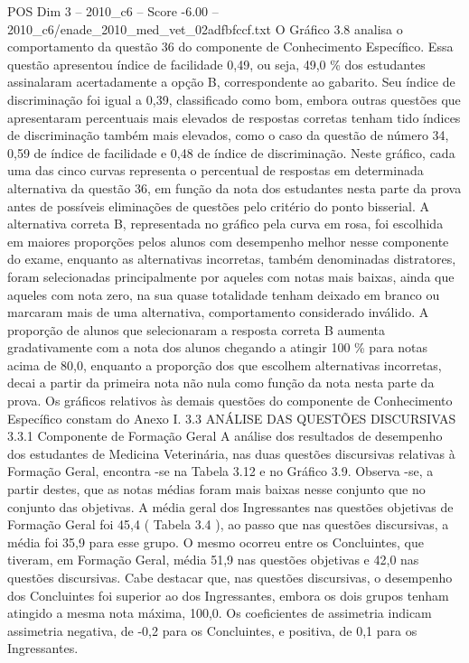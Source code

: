 \begin{textsample}{POS Dim 3 – 2010\_c6 – Score -6.00 – 2010\_c6/enade\_2010\_med\_vet\_02adfbfccf.txt}
O Gráfico 3.8 analisa o comportamento da questão 36 do componente de Conhecimento Específico.
Essa questão apresentou índice de facilidade 0,49, ou seja, 49,0 \% dos estudantes assinalaram acertadamente a opção B, correspondente ao gabarito.
Seu índice de discriminação foi igual a 0,39, classificado como bom, embora outras questões que apresentaram percentuais mais elevados de respostas corretas tenham tido índices de discriminação também mais elevados, como o caso da questão de número 34, 0,59 de índice de facilidade e 0,48 de índice de discriminação.
Neste gráfico, cada uma das cinco curvas representa o percentual de respostas em determinada alternativa da questão 36, em função da nota dos estudantes nesta parte da prova antes de possíveis eliminações de questões pelo critério do ponto bisserial.
A alternativa correta B, representada no gráfico pela curva em rosa, foi escolhida em maiores proporções pelos alunos com desempenho melhor nesse componente do exame, enquanto as alternativas incorretas, também denominadas distratores, foram selecionadas principalmente por aqueles com notas mais baixas, ainda que aqueles com nota zero, na sua quase totalidade tenham deixado em branco ou marcaram mais de uma alternativa, comportamento considerado inválido.
A proporção de alunos que selecionaram a resposta correta B aumenta gradativamente com a nota dos alunos chegando a atingir 100 \% para notas acima de 80,0, enquanto a proporção dos que escolhem alternativas incorretas, decai a partir da primeira nota não nula como função da nota nesta parte da prova.
Os gráficos relativos às demais questões do componente de Conhecimento Específico constam do Anexo I. 3.3 ANÁLISE DAS QUESTÕES DISCURSIVAS 3.3.1 Componente de Formação Geral A análise dos resultados de desempenho dos estudantes de Medicina Veterinária, nas duas questões discursivas relativas à Formação Geral, encontra -se na Tabela 3.12 e no Gráfico 3.9.
Observa -se, a partir destes, que as notas médias foram mais baixas nesse conjunto que no conjunto das objetivas.
A média geral dos Ingressantes nas questões objetivas de Formação Geral foi 45,4 ( Tabela 3.4 ), ao passo que nas questões discursivas, a média foi 35,9 para esse grupo.
O mesmo ocorreu entre os Concluintes, que tiveram, em Formação Geral, média 51,9 nas questões objetivas e 42,0 nas questões discursivas.
Cabe destacar que, nas questões discursivas, o desempenho dos Concluintes foi superior ao dos Ingressantes, embora os dois grupos tenham atingido a mesma nota máxima, 100,0.
Os coeficientes de assimetria indicam assimetria negativa, de -0,2 para os Concluintes, e positiva, de 0,1 para os Ingressantes.

\end{textsample}
